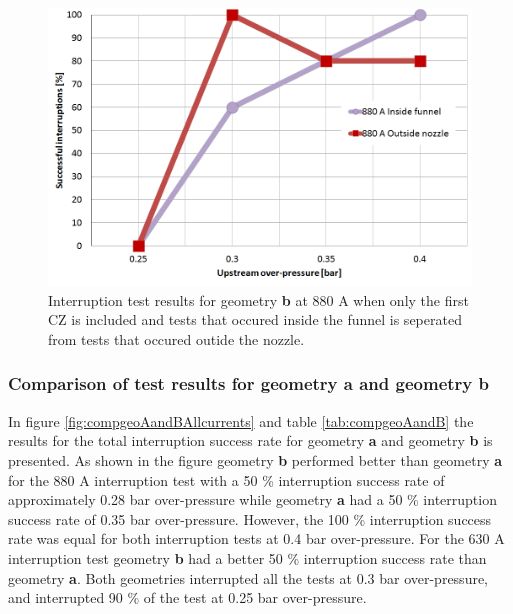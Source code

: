 \documentclass[10pt,b5paper,twoside]{article}
\begin{document}
\begin{figure}[H]
\centering
\includegraphics[scale=0.45]{Bilder/Results/geoB880ampcomp.PNG}
\caption{Interruption test results for geometry \textbf{b} at 880 A when only the first CZ is included and tests that occured inside the funnel is seperated from tests that occured outide the nozzle.} \label{fig:results880AgeoBcomp}
\end{figure}

\subsubsection{Comparison of test results for geometry \textbf{a} and geometry \textbf{b}}

In figure \ref{fig:compgeoAandBAllcurrents} and table \ref{tab:compgeoAandB} the results for the total interruption success rate for geometry \textbf{a} and geometry \textbf{b} is presented. As shown in the figure geometry \textbf{b} performed better than geometry \textbf{a} for the 880 A interruption test with a 50 \% interruption success rate of approximately 0.28 bar over-pressure while geometry \textbf{a} had a 50 \% interruption success rate of 0.35 bar over-pressure. However, the 100 \% interruption success rate was equal for both interruption tests at 0.4 bar over-pressure. For the 630 A interruption test geometry \textbf{b} had a better 50 \% interruption success rate than geometry \textbf{a}. Both geometries interrupted all the tests at 0.3 bar over-pressure, and interrupted 90 \% of the test at 0.25 bar over-pressure.
\end{document}
